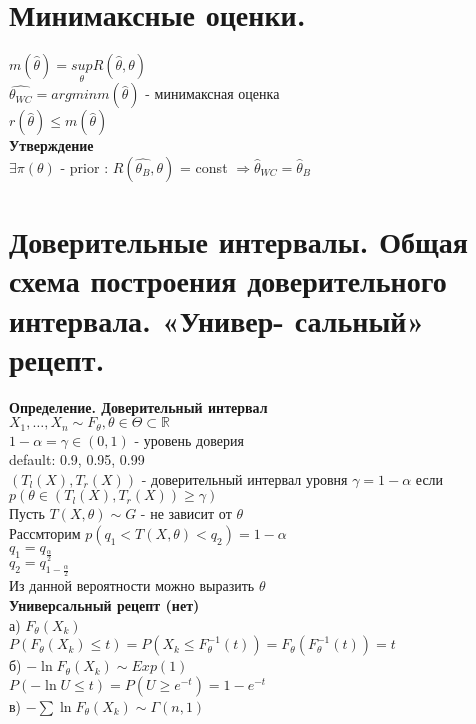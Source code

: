 \documentclass{article}
\newcommand\0{\mathbb{0}}
\newcommand\1{\mathbb{1}}
\newcommand{\Rto}{\Rightarrow}
\begin{document}
\section{Минимаксные оценки.}
$m(\widehat{\theta}) = \underset{\theta}{sup} R(\widehat{\theta}, \theta)$\\
$\widehat{\theta_{WC}} = argmin m(\widehat{\theta})$ - минимаксная оценка\\
$r(\widehat{\theta}) \leq m(\widehat{\theta})$\\
\textbf{Утверждение}\\
$\exists \pi(\theta)$ - prior : $R(\widehat{\theta_B}, \theta)$ = const $\Rto \widehat{\theta}_{WC} = \widehat{\theta}_B$\\
\section{Доверительные интервалы. Общая схема построения доверительного интервала. «Универ-
сальный» рецепт.}
\textbf{Определение. Доверительный интервал}\\
$X_1, \dots, X_n \sim F_\theta, \theta \in \Theta \subset \mathbb{R}$\\
$1 - \alpha = \gamma \in (0, 1)$ - уровень доверия\\
default: 0.9, 0.95, 0.99\\
$(T_l(X), T_r(X))$ - доверительный интервал уровня $\gamma = 1 - \alpha$ если $p(\theta \in (T_l(X), T_r(X)) \geq \gamma)$\\
Пусть $T(X, \theta) \sim G$ - не зависит от $\theta$\\
Рассмторим $p(q_1 < T(X, \theta) < q_2) = 1 - \alpha$\\
$q_1 = q_{\frac{\alpha}{2}}$\\
$q_2 = q_{1 - \frac{\alpha}{2}}$\\
Из данной вероятности можно выразить $\theta$\\
\textbf{Универсальный рецепт (нет)}\\
а) $F_\theta(X_k)$\\
$P(F_\theta(X_k) \leq t) = P(X_k \leq F_\theta^{-1}(t)) = F_\theta(F_\theta^{-1}(t)) = t$\\
б) $-\ln{F_\theta(X_k)} \sim Exp(1)$\\
$P(-\ln{U} \leq t) = P(U \geq e^{-t}) = 1 - e^{-t}$\\
в) $-\displaystyle\sum \ln{F_\theta(X_k)} \sim \Gamma(n, 1)$\\
\end{document}
